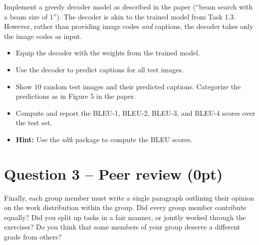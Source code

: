 \documentclass[a4paper,twoside,10pt]{article}
\begin{document}
Implement a greedy decoder model as described in the paper (``beam search with a beam size of $1$'').
The decoder is akin to the trained model from Task 1.3.
However, rather than providing image codes \emph{and} captions, the decoder takes only the image codes as input.
\begin{itemize}
\item Equip the decoder with the weights from the trained model.
\item Use the decoder to predict captions for all test images.
\item Show $10$ random test images and their predicted captions.
Categorize the predictions as in Figure 5 in the paper.
\item Compute and report the BLEU-1, BLEU-2, BLEU-3, and BLEU-4 scores over the test set.
\item \textbf{Hint:} Use the \emph{nltk} package to compute the BLEU scores.
\end{itemize}



\section*{Question 3 -- Peer review (0pt)}

Finally, each group member must write a single paragraph outlining their opinion on the work distribution within the group. Did every group member contribute equally? Did you split up tasks in a fair manner, or jointly worked through the exercises? Do you think that some members of your group deserve a different grade from others?
	
	
\end{document}
